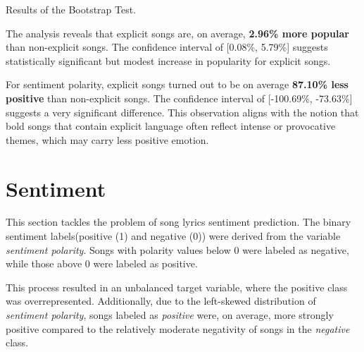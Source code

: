 \begin{table}[H]
\centering
\caption{Results of the Bootstrap Test.}
\end{table}


The analysis reveals that explicit songs are, on average, \textbf{2.96\% more
popular} than non-explicit songs. The confidence interval of [0.08\%, 5.79\%]
suggests statistically significant but modest increase in popularity for
explicit songs.

For sentiment polarity, explicit songs turned out to be on average
\textbf{87.10\% less positive} than non-explicit songs. The confidence interval
of [-100.69\%, -73.63\%] suggests a very significant difference. This
observation aligns with the notion that bold songs that contain explicit
language often reflect intense or provocative themes, which may carry less
positive emotion.

\section{Sentiment}
\label{sec:sentiment}

This section tackles the problem of song lyrics sentiment prediction. The
binary sentiment labels(positive (1) and negative (0)) were derived from the
variable \textit{sentiment polarity}. Songs with polarity values below 0 were
labeled as negative, while those above 0 were labeled as positive.

This process resulted in an unbalanced target variable, where the positive
class was overrepresented. Additionally, due to the left-skewed distribution of
\textit{sentiment polarity}, songs labeled as \textit{positive} were, on
average, more strongly positive compared to the relatively moderate negativity
of songs in the \textit{negative} class.

